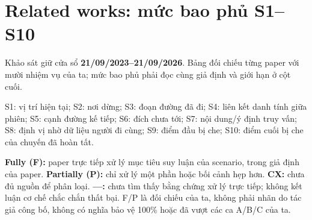 \section{Related works: mức bao phủ S1–S10}
Khảo sát giữ cửa sổ \textbf{21/09/2023–21/09/2026}. Bảng đối chiếu từng paper với mười nhiệm vụ của ta; mức bao phủ phải đọc cùng giả định và giới hạn ở cột cuối.

S1: vị trí hiện tại; S2: nơi dừng; S3: đoạn đường đã đi; S4: liên kết danh tính giữa phiên; S5: cạnh đường kế tiếp; S6: đích chưa tới; S7: nội dung/ý định truy vấn; S8: định vị nhờ dữ liệu người đi cùng; S9: điểm đầu bị che; S10: điểm cuối bị che của chuyến đã hoàn tất.

\textbf{Fully (F):} paper trực tiếp xử lý mục tiêu suy luận của scenario, trong giả định của paper. \textbf{Partially (P):} chỉ xử lý một phần hoặc bối cảnh hẹp hơn. \textbf{CX:} chưa đủ nguồn để phân loại. \textbf{—:} chưa tìm thấy bằng chứng xử lý trực tiếp; không kết luận cơ chế chắc chắn thất bại. F/P là đối chiếu của ta, không phải nhãn do tác giả công bố, không có nghĩa bảo vệ 100\% hoặc đã vượt các ca A/B/C của ta.

